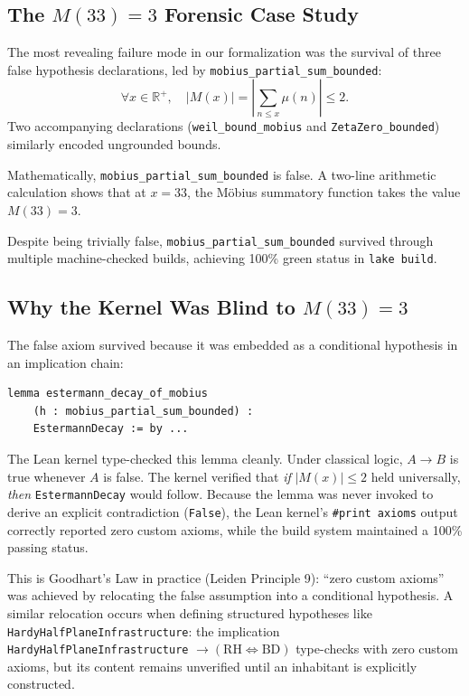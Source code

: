 \documentclass[11pt,a4paper]{article}
\theoremstyle{definition}
\theoremstyle{remark}
\begin{document}
\subsection{The $M(33)=3$ Forensic Case Study}

The most revealing failure mode in our formalization was the survival of three false hypothesis declarations, led by \texttt{mobius\_partial\_sum\_bounded}:
\[
\forall x \in \mathbb{R}^+, \quad |M(x)| = \left| \sum_{n \le x} \mu(n) \right| \le 2.
\]
Two accompanying declarations (\texttt{weil\_bound\_mobius} and \texttt{ZetaZero\_bounded}) similarly encoded ungrounded bounds.

Mathematically, \texttt{mobius\_partial\_sum\_bounded} is false. A two-line arithmetic calculation shows that at $x = 33$, the M\"obius summatory function takes the value $M(33) = 3$. 

Despite being trivially false, \texttt{mobius\_partial\_sum\_bounded} survived through multiple machine-checked builds, achieving 100\% green status in \texttt{lake build}.

\subsection{Why the Kernel Was Blind to $M(33)=3$}

The false axiom survived because it was embedded as a conditional hypothesis in an implication chain:
\begin{verbatim}
lemma estermann_decay_of_mobius 
    (h : mobius_partial_sum_bounded) : 
    EstermannDecay := by ...
\end{verbatim}

The Lean kernel type-checked this lemma cleanly. Under classical logic, $A \to B$ is true whenever $A$ is false. The kernel verified that \emph{if} $|M(x)| \le 2$ held universally, \emph{then} \texttt{EstermannDecay} would follow. Because the lemma was never invoked to derive an explicit contradiction (\texttt{False}), the Lean kernel's \texttt{\#print axioms} output correctly reported zero custom axioms, while the build system maintained a 100\% passing status.

This is Goodhart's Law in practice (Leiden Principle 9): ``zero custom axioms'' was achieved by relocating the false assumption into a conditional hypothesis. A similar relocation occurs when defining structured hypotheses like \texttt{HardyHalfPlaneInfrastructure}: the implication \texttt{HardyHalfPlaneInfrastructure} $\to (\text{RH} \iff \text{BD})$ type-checks with zero custom axioms, but its content remains unverified until an inhabitant is explicitly constructed.
\end{document}
